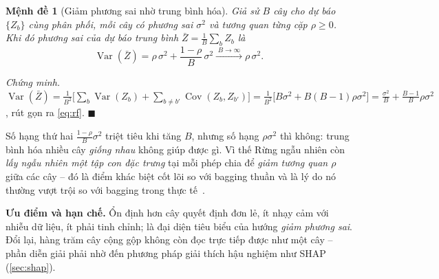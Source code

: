\documentclass[12pt,a4paper,oneside]{report}
\theoremstyle{vnplain}
\newtheorem{menhde}[dlytheo]{Mệnh đề}
\theoremstyle{vndef}
\renewcommand{\proofname}{Chứng minh}
\renewenvironment{proof}[1][\proofname]{\par\noindent\textit{#1.}\ }{\hfill$\blacksquare$\par\vspace{4pt}}
\begin{document}
\begin{menhde}[Giảm phương sai nhờ trung bình hóa]\label{md:rf}
Giả sử $B$ cây cho dự báo $\{Z_b\}$ cùng phân phối, mỗi cây có phương sai $\sigma^2$ và
tương quan từng cặp $\rho\ge 0$. Khi đó phương sai của dự báo trung bình
$\bar Z=\frac1B\sum_b Z_b$ là
\begin{equation}
  \operatorname{Var}(\bar Z)=\rho\,\sigma^2+\frac{1-\rho}{B}\,\sigma^2
  \xrightarrow{\;B\to\infty\;}\rho\,\sigma^2.
  \label{eq:rf}
\end{equation}
\end{menhde}
\begin{proof}
$\operatorname{Var}(\bar Z)=\frac{1}{B^2}\big[\sum_b\operatorname{Var}(Z_b)+\sum_{b\ne b'}
\operatorname{Cov}(Z_b,Z_{b'})\big]=\frac{1}{B^2}\big[B\sigma^2+B(B-1)\rho\sigma^2\big]
=\frac{\sigma^2}{B}+\frac{B-1}{B}\rho\sigma^2$, rút gọn ra \cref{eq:rf}.
\end{proof}

Số hạng thứ hai $\frac{1-\rho}{B}\sigma^2$ triệt tiêu khi tăng $B$, nhưng số hạng
$\rho\sigma^2$ thì không: trung bình hóa nhiều cây \emph{giống nhau} không giúp được gì.
Vì thế Rừng ngẫu nhiên còn \emph{lấy ngẫu nhiên một tập con đặc trưng} tại mỗi phép chia
để \emph{giảm tương quan $\rho$} giữa các cây -- đó là điểm khác biệt cốt lõi so với
bagging thuần và là lý do nó thường vượt trội so với bagging trong thực tế~\cite[Ch.~15]{hastie2009}.

\noindent\textbf{Ưu điểm và hạn chế.} Ổn định hơn cây quyết định đơn lẻ, ít nhạy cảm với nhiễu dữ liệu, ít
phải tinh chỉnh; là đại diện tiêu biểu của hướng \emph{giảm phương sai}. Đổi lại, hàng
trăm cây cộng gộp không còn đọc trực tiếp được như một cây -- phần diễn giải phải nhờ đến
phương pháp giải thích hậu nghiệm như SHAP (\cref{sec:shap}).
\end{document}
